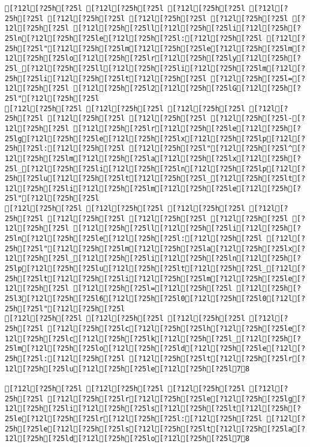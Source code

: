 \documentclass{scrartcl}
\begin{document}
\begin{Verbatim}
[?12l[?25h[?25l [?12l[?25h[?25l [?12l[?25h[?25l [?12l[?25h[?25l [?12l[?25h[?25l [?12l[?25h[?25l [?12l[?25h[?25l [?12l[?25h[?25l [?12l[?25h[?25ll[?12l[?25h[?25li[?12l[?25h[?25ln[?12l[?25h[?25le[?12l[?25h[?25l:[?12l[?25h[?25l [?12l[?25h[?25l"[?12l[?25h[?25lm[?12l[?25h[?25le[?12l[?25h[?25lm[?12l[?25h[?25lo[?12l[?25h[?25lr[?12l[?25h[?25ly[?12l[?25h[?25l_[?12l[?25h[?25ll[?12l[?25h[?25li[?12l[?25h[?25lm[?12l[?25h[?25li[?12l[?25h[?25lt[?12l[?25h[?25l [?12l[?25h[?25l=[?12l[?25h[?25l [?12l[?25h[?25l2[?12l[?25h[?25lG[?12l[?25h[?25l"[?12l[?25h[?25l
[?12l[?25h[?25l [?12l[?25h[?25l [?12l[?25h[?25l [?12l[?25h[?25l [?12l[?25h[?25l [?12l[?25h[?25l [?12l[?25h[?25l-[?12l[?25h[?25l [?12l[?25h[?25lr[?12l[?25h[?25le[?12l[?25h[?25lg[?12l[?25h[?25le[?12l[?25h[?25lx[?12l[?25h[?25lp[?12l[?25h[?25l:[?12l[?25h[?25l [?12l[?25h[?25l"[?12l[?25h[?25l^[?12l[?25h[?25lm[?12l[?25h[?25la[?12l[?25h[?25lx[?12l[?25h[?25l_[?12l[?25h[?25li[?12l[?25h[?25ln[?12l[?25h[?25lp[?12l[?25h[?25lu[?12l[?25h[?25lt[?12l[?25h[?25l_[?12l[?25h[?25lt[?12l[?25h[?25li[?12l[?25h[?25lm[?12l[?25h[?25le[?12l[?25h[?25l"[?12l[?25h[?25l
[?12l[?25h[?25l [?12l[?25h[?25l [?12l[?25h[?25l [?12l[?25h[?25l [?12l[?25h[?25l [?12l[?25h[?25l [?12l[?25h[?25l [?12l[?25h[?25l [?12l[?25h[?25ll[?12l[?25h[?25li[?12l[?25h[?25ln[?12l[?25h[?25le[?12l[?25h[?25l:[?12l[?25h[?25l [?12l[?25h[?25l"[?12l[?25h[?25lm[?12l[?25h[?25la[?12l[?25h[?25lx[?12l[?25h[?25l_[?12l[?25h[?25li[?12l[?25h[?25ln[?12l[?25h[?25lp[?12l[?25h[?25lu[?12l[?25h[?25lt[?12l[?25h[?25l_[?12l[?25h[?25lt[?12l[?25h[?25li[?12l[?25h[?25lm[?12l[?25h[?25le[?12l[?25h[?25l [?12l[?25h[?25l=[?12l[?25h[?25l [?12l[?25h[?25l3[?12l[?25h[?25l6[?12l[?25h[?25l0[?12l[?25h[?25l0[?12l[?25h[?25l"[?12l[?25h[?25l
[?12l[?25h[?25l [?12l[?25h[?25l [?12l[?25h[?25l [?12l[?25h[?25l [?12l[?25h[?25lc[?12l[?25h[?25lh[?12l[?25h[?25le[?12l[?25h[?25lc[?12l[?25h[?25lk[?12l[?25h[?25l_[?12l[?25h[?25lm[?12l[?25h[?25lo[?12l[?25h[?25ld[?12l[?25h[?25le[?12l[?25h[?25l:[?12l[?25h[?25l [?12l[?25h[?25lt[?12l[?25h[?25lr[?12l[?25h[?25lu[?12l[?25h[?25le[?12l[?25h[?25l78

[?12l[?25h[?25l [?12l[?25h[?25l [?12l[?25h[?25l [?12l[?25h[?25l [?12l[?25h[?25lr[?12l[?25h[?25le[?12l[?25h[?25lg[?12l[?25h[?25li[?12l[?25h[?25ls[?12l[?25h[?25lt[?12l[?25h[?25le[?12l[?25h[?25lr[?12l[?25h[?25l:[?12l[?25h[?25l [?12l[?25h[?25le[?12l[?25h[?25ls[?12l[?25h[?25lt[?12l[?25h[?25la[?12l[?25h[?25ld[?12l[?25h[?25lo[?12l[?25h[?25l78


\end{Verbatim}
\end{document}
